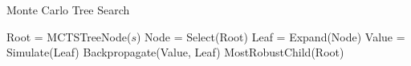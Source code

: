
\begin{algorithm}[H]
    \caption{Monte Carlo Tree Search}
    \label{alg:mcts}
    \begin{algorithmic}[1]
    
        \State Root = MCTSTreeNode($s$)
            \State Node = Select(Root)
            \State Leaf = Expand(Node)
            \State Value = Simulate(Leaf)
            \State Backpropagate(Value, Leaf)
        \EndWhile
        \State \Return MostRobustChild(Root)
    \EndProcedure
    \end{algorithmic}
\end{algorithm}
